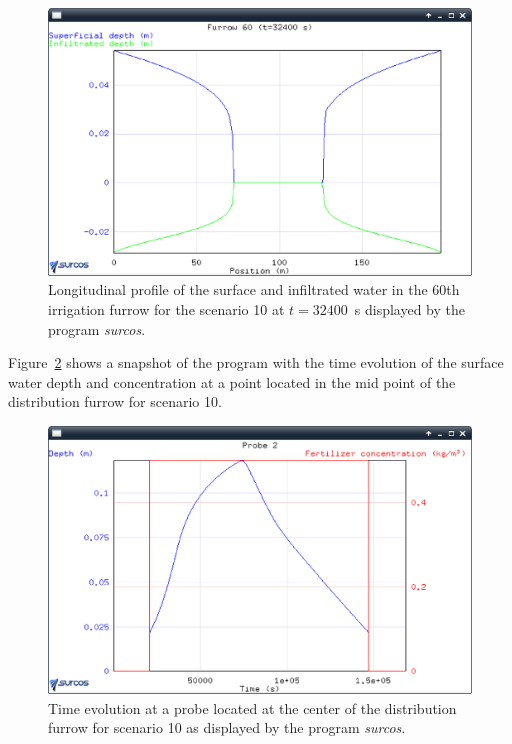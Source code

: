 \documentclass[review,authoryear]{elsarticle}
\begin{document}
\begin{figure}[ht!]
\begin{center}
\includegraphics[width=\textwidth]{evoSurcoEN.eps}
\caption{Longitudinal profile of the surface and infiltrated
water in the 60th irrigation furrow for the scenario 10 at $t=32400$~s displayed by
the program \emph{surcos}.}\label{evo2}
\end{center}
\end{figure}

Figure~\ref{evoSonda} shows a snapshot of the program with the time evolution of
the surface water depth and concentration at a point located in the mid point of
the distribution furrow for scenario 10. 
\begin{figure}[ht!]
\begin{center}
\includegraphics[width=\textwidth]{evoSondaEN.eps}
\caption{Time evolution at a probe located at the center of the distribution
furrow for scenario 10 as displayed by the program \emph{surcos}.}\label{evoSonda}
\end{center}
\end{figure}
\end{document}

